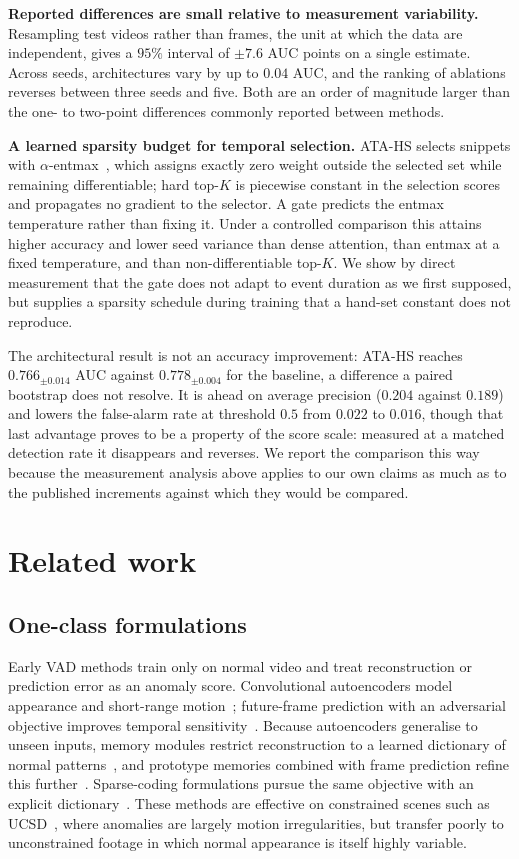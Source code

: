 \documentclass[11pt]{article}
\begin{document}
\textbf{Reported differences are small relative to measurement variability.}
Resampling test videos rather than frames, the unit at which the data are
independent, gives a $95\%$ interval of $\pm7.6$ AUC points on a single estimate.
Across seeds, architectures vary by up to $0.04$ AUC, and the ranking of ablations
reverses between three seeds and five. Both are an order of magnitude larger than
the one- to two-point differences commonly reported between methods.

\textbf{A learned sparsity budget for temporal selection.} ATA-HS selects
snippets with $\alpha$-entmax~\citep{peters2019sparse}, which assigns exactly
zero weight outside the selected set while remaining differentiable; hard top-$K$
is piecewise constant in the selection scores and propagates no gradient to the
selector. A gate predicts the entmax temperature rather than fixing it. Under a
controlled comparison this attains higher accuracy and lower seed variance than
dense attention, than entmax at a fixed temperature, and than non-differentiable
top-$K$. We show by direct measurement that the gate does not adapt to event
duration as we first supposed, but supplies a sparsity schedule during training
that a hand-set constant does not reproduce.

The architectural result is not an accuracy improvement: ATA-HS reaches
$0.766_{\pm0.014}$ AUC against $0.778_{\pm0.004}$ for the baseline, a difference
a paired bootstrap does not resolve. It is ahead on average precision
($0.204$ against $0.189$) and lowers the false-alarm rate at threshold $0.5$ from
$0.022$ to $0.016$, though that last advantage proves to be a property of the
score scale: measured at a matched detection rate it disappears and reverses.
We report the comparison this way because the measurement
analysis above applies to our own claims as much as to the published increments
against which they would be compared.

\section{Related work}
\label{sec:related}

\subsection{One-class formulations}
Early VAD methods train only on normal video and treat reconstruction or
prediction error as an anomaly score. Convolutional autoencoders model
appearance and short-range motion~\citep{hasan2016learning}; future-frame
prediction with an adversarial objective improves temporal
sensitivity~\citep{liu2018future}. Because autoencoders generalise to unseen
inputs, memory modules restrict reconstruction to a learned dictionary of normal
patterns~\citep{gong2019memorizing}, and prototype memories combined with frame
prediction refine this further~\citep{park2020learning}. Sparse-coding
formulations pursue the same
objective with an explicit dictionary~\citep{lu2013abnormal,luo2017revisit}.
These methods are effective on constrained scenes such as
UCSD~\citep{mahadevan2010anomaly}, where anomalies are largely motion
irregularities, but transfer poorly to unconstrained footage in which normal
appearance is itself highly variable.
\end{document}
